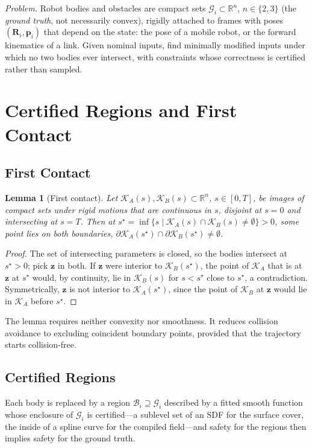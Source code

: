 \documentclass[journal]{IEEEtran}
\newtheorem{lemma}{Lemma}
\theoremstyle{definition}
\newcommand{\R}{\mathbb{R}}
\newcommand{\Rot}{\mathbf{R}}
\begin{document}
\emph{Problem.} Robot bodies and obstacles are compact sets $\mathcal G_i\subset\R^n$, $n\in\{2,3\}$
(the \emph{ground truth}, not necessarily convex), rigidly attached to frames with poses
$(\Rot_i,\mathbf p_i)$ that depend on the state: the pose of a mobile robot, or the forward
kinematics of a link. Given nominal inputs, find minimally modified inputs under which no two
bodies ever intersect, with constraints whose correctness is certified rather than sampled.

\section{Certified Regions and First Contact}\label{sec:regions}

\subsection{First Contact}
\begin{lemma}[First contact]\label{lem:contact}
Let $\mathcal K_A(s),\mathcal K_B(s)\subset\R^n$, $s\in[0,T]$, be images of compact sets under rigid
motions that are continuous in $s$, disjoint at $s=0$ and intersecting at $s=T$. Then at
$s^\star=\inf\{s\mid\mathcal K_A(s)\cap\mathcal K_B(s)\neq\emptyset\}>0$, some point lies on both
boundaries, $\partial\mathcal K_A(s^\star)\cap\partial\mathcal K_B(s^\star)\neq\emptyset$.
\end{lemma}
\begin{proof}
The set of intersecting parameters is closed, so the bodies intersect at $s^\star>0$; pick $\mathbf z$
in both. If $\mathbf z$ were interior to $\mathcal K_B(s^\star)$, the point of $\mathcal K_A$ that
is at $\mathbf z$ at $s^\star$ would, by continuity, lie in $\mathcal K_B(s)$ for $s<s^\star$ close
to $s^\star$, a contradiction. Symmetrically, $\mathbf z$ is not interior to $\mathcal K_A(s^\star)$,
since the point of $\mathcal K_B$ at $\mathbf z$ would lie in $\mathcal K_A$ before $s^\star$.
\end{proof}
The lemma requires neither convexity nor smoothness. It reduces collision avoidance to excluding
coincident boundary points, provided that the trajectory starts collision-free.

\subsection{Certified Regions}\label{sec:cert-body}
Each body is replaced by a region $\mathcal B_i\supseteq\mathcal G_i$ described by a fitted smooth
function whose enclosure of $\mathcal G_i$ is certified---a sublevel set of an SDF for the surface
cover, the inside of a spline curve for the compiled field---and safety for the regions then implies
safety for the ground truth.
\end{document}
